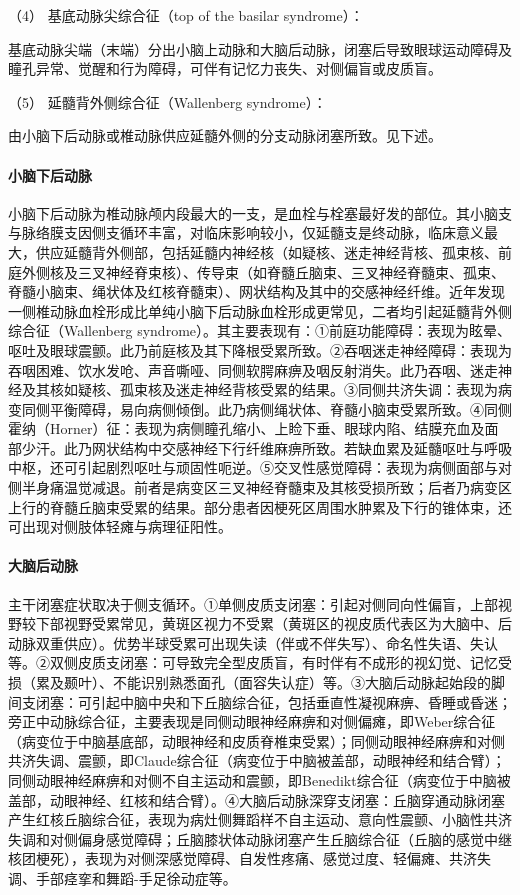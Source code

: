 \hypertarget{text00242.htmlux5cux23CHP8-1-2-2-1-2-4-4}{}
（4） 基底动脉尖综合征（top of the basilar syndrome）：

基底动脉尖端（末端）分出小脑上动脉和大脑后动脉，闭塞后导致眼球运动障碍及瞳孔异常、觉醒和行为障碍，可伴有记忆力丧失、对侧偏盲或皮质盲。

\hypertarget{text00242.htmlux5cux23CHP8-1-2-2-1-2-4-5}{}
（5） 延髓背外侧综合征（Wallenberg syndrome）：

由小脑下后动脉或椎动脉供应延髓外侧的分支动脉闭塞所致。见下述。

\paragraph{小脑下后动脉}

小脑下后动脉为椎动脉颅内段最大的一支，是血栓与栓塞最好发的部位。其小脑支与脉络膜支因侧支循环丰富，对临床影响较小，仅延髓支是终动脉，临床意义最大，供应延髓背外侧部，包括延髓内神经核（如疑核、迷走神经背核、孤束核、前庭外侧核及三叉神经脊束核）、传导束（如脊髓丘脑束、三叉神经脊髓束、孤束、脊髓小脑束、绳状体及红核脊髓束）、网状结构及其中的交感神经纤维。近年发现一侧椎动脉血栓形成比单纯小脑下后动脉血栓形成更常见，二者均引起延髓背外侧综合征（Wallenberg
syndrome）。其主要表现有：①前庭功能障碍：表现为眩晕、呕吐及眼球震颤。此乃前庭核及其下降根受累所致。②吞咽迷走神经障碍：表现为吞咽困难、饮水发呛、声音嘶哑、同侧软腭麻痹及咽反射消失。此乃吞咽、迷走神经及其核如疑核、孤束核及迷走神经背核受累的结果。③同侧共济失调：表现为病变同侧平衡障碍，易向病侧倾倒。此乃病侧绳状体、脊髓小脑束受累所致。④同侧霍纳（Horner）征：表现为病侧瞳孔缩小、上睑下垂、眼球内陷、结膜充血及面部少汗。此乃网状结构中交感神经下行纤维麻痹所致。若缺血累及延髓呕吐与呼吸中枢，还可引起剧烈呕吐与顽固性呃逆。⑤交叉性感觉障碍：表现为病侧面部与对侧半身痛温觉减退。前者是病变区三叉神经脊髓束及其核受损所致；后者乃病变区上行的脊髓丘脑束受累的结果。部分患者因梗死区周围水肿累及下行的锥体束，还可出现对侧肢体轻瘫与病理征阳性。

\paragraph{大脑后动脉}

主干闭塞症状取决于侧支循环。①单侧皮质支闭塞：引起对侧同向性偏盲，上部视野较下部视野受累常见，黄斑区视力不受累（黄斑区的视皮质代表区为大脑中、后动脉双重供应）。优势半球受累可出现失读（伴或不伴失写）、命名性失语、失认等。②双侧皮质支闭塞：可导致完全型皮质盲，有时伴有不成形的视幻觉、记忆受损（累及颞叶）、不能识别熟悉面孔（面容失认症）等。③大脑后动脉起始段的脚间支闭塞：可引起中脑中央和下丘脑综合征，包括垂直性凝视麻痹、昏睡或昏迷；旁正中动脉综合征，主要表现是同侧动眼神经麻痹和对侧偏瘫，即Weber综合征（病变位于中脑基底部，动眼神经和皮质脊椎束受累）；同侧动眼神经麻痹和对侧共济失调、震颤，即Claude综合征（病变位于中脑被盖部，动眼神经和结合臂）；同侧动眼神经麻痹和对侧不自主运动和震颤，即Benedikt综合征（病变位于中脑被盖部，动眼神经、红核和结合臂）。④大脑后动脉深穿支闭塞：丘脑穿通动脉闭塞产生红核丘脑综合征，表现为病灶侧舞蹈样不自主运动、意向性震颤、小脑性共济失调和对侧偏身感觉障碍；丘脑膝状体动脉闭塞产生丘脑综合征（丘脑的感觉中继核团梗死），表现为对侧深感觉障碍、自发性疼痛、感觉过度、轻偏瘫、共济失调、手部痉挛和舞蹈-手足徐动症等。

